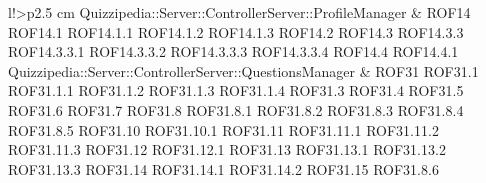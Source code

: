 \begin{tabella}{l!{\VRule}>{\centering\arraybackslash}p{2.5 cm}}
Quizzipedia::Server::ControllerServer::ProfileManager & ROF14 \linebreak ROF14.1 \linebreak ROF14.1.1 \linebreak ROF14.1.2 \linebreak ROF14.1.3 \linebreak ROF14.2 \linebreak ROF14.3 \linebreak ROF14.3.3 \linebreak ROF14.3.3.1 \linebreak ROF14.3.3.2 \linebreak ROF14.3.3.3 \linebreak ROF14.3.3.4 \linebreak ROF14.4 \linebreak ROF14.4.1 \\
Quizzipedia::Server::ControllerServer::QuestionsManager & ROF31 \linebreak ROF31.1 \linebreak ROF31.1.1 \linebreak ROF31.1.2 \linebreak ROF31.1.3 \linebreak ROF31.1.4 \linebreak ROF31.3 \linebreak ROF31.4 \linebreak ROF31.5 \linebreak ROF31.6 \linebreak ROF31.7 \linebreak ROF31.8 \linebreak ROF31.8.1 \linebreak ROF31.8.2 \linebreak ROF31.8.3 \linebreak ROF31.8.4 \linebreak ROF31.8.5 \linebreak ROF31.10 \linebreak ROF31.10.1 \linebreak ROF31.11 \linebreak ROF31.11.1 \linebreak ROF31.11.2 \linebreak ROF31.11.3 \linebreak ROF31.12 \linebreak ROF31.12.1 \linebreak ROF31.13 \linebreak ROF31.13.1 \linebreak ROF31.13.2 \linebreak ROF31.13.3 \linebreak ROF31.14 \linebreak ROF31.14.1 \linebreak ROF31.14.2 \linebreak ROF31.15 \linebreak ROF31.8.6 \\

\end{tabella}
